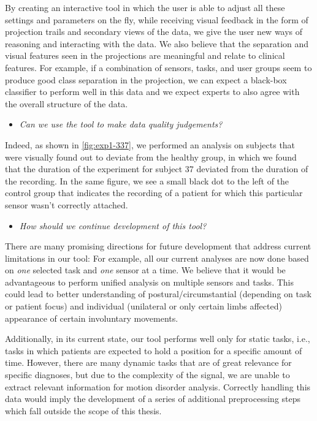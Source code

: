 By creating an interactive tool in which the user is able to adjust all these settings and parameters on the fly, while receiving visual feedback in the form of projection trails and secondary views of the data, we give the user new ways of reasoning and interacting with the data. We also believe that the separation and visual features seen in the projections are meaningful and relate to clinical features. For example, if a combination of sensors, tasks, and user groups seem to produce good class separation in the projection, we can expect a black-box classifier to perform well in this data \citep{rauber_aid} and we expect experts to also agree with the overall structure of the data.


\begin{itemize}
    \item \emph{Can we use the tool to make data quality judgements?}
\end{itemize}
Indeed, as shown in \cref{fig:exp1-337}, we performed an analysis on subjects that were visually found out to deviate from the healthy group, in which we found that the duration of the experiment for subject 37 deviated from the duration of the recording. In the same figure, we see a small black dot to the left of the control group that indicates the recording of a patient for which this particular sensor wasn't correctly attached. 

\begin{itemize}
    \item \emph{How should we continue development of this tool?}
\end{itemize}
There are many promising directions for future development that address current limitations in our tool: For example, all our current analyses are now done based on \emph{one} selected task and \emph{one} sensor at a time. We believe that it would be advantageous to perform unified analysis on multiple sensors and tasks. This could lead to better understanding of postural/circumstantial (depending on task or patient focus) and individual (unilateral or only certain limbs affected) appearance of certain involuntary movements.

Additionally, in its current state, our tool performs well only for static tasks, i.e., tasks in which patients are expected to hold a position for a specific amount of time. However, there are many dynamic tasks that are of great relevance for specific diagnoses, but due to the complexity of the signal, we are unable to extract relevant information for motion disorder analysis. Correctly handling this data would imply the development of a series of additional preprocessing steps which fall outside the scope of this thesis.

